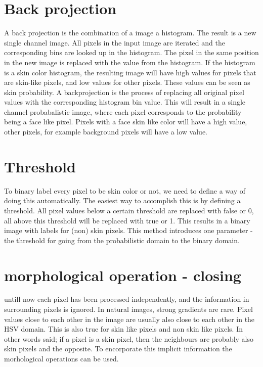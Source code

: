 \section{Back projection}
A back projection is the combination of a image a histogram. The result is a new single channel image. All pixels in the input image are iterated and the corresponding bins are looked up in the histogram. The pixel in the same position in the new image is replaced with the value from the histogram. If the histogram is a skin color histogram, the resulting image will have high values for pixels that are skin-like pixels, and low values for other pixels. These values can be seen as skin probability.
A backprojection is the process of replacing all original pixel values with the corresponding histogram bin value. This will result in a single channel probabalistic image, where each pixel corresponds to the probability being a face like pixel. Pixels with a face skin like color will have a high value, other pixels, for example background pixels will have a low value.

\section{Threshold}
To binary label every pixel to be skin color or not, we need to define a way of doing this automatically. The easiest way to accomplish this is by defining a threshold. All pixel values below a certain threshold are replaced with false or 0, all above this threshold will be replaced with true or 1. This results in a binary image with labels for (non) skin pixels. This method introduces one parameter - the threshold for going from the probabilistic domain to the binary domain.

\section{morphological operation - closing}
untill now each pixel has been processed independently, and the information in surrounding pixels is ignored. In natural images, strong gradients are rare. Pixel values close to each other in the image are usually also close to each other in the HSV domain. This is also true for skin like pixels and non skin like pixels. In other words said; if a pixel is a skin pixel, then the neighbours are probably also skin pixels and the opposite. To encorporate this implicit information the morhological operations can be used.

